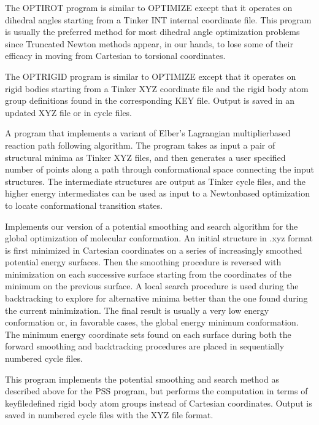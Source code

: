 \documentclass[letterpaper,11pt,english]{sphinxmanual}
\begin{document}

The OPTIROT program is similar to OPTIMIZE except that it operates on dihedral angles starting from a Tinker INT internal coordinate file. This program is usually the preferred method for most dihedral angle optimization problems since Truncated Newton methods appear, in our hands, to lose some of their efficacy in moving from Cartesian to torsional coordinates.


The OPTRIGID program is similar to OPTIMIZE except that it operates on rigid bodies starting from a Tinker XYZ coordinate file and the rigid body atom group definitions found in the corresponding KEY file. Output is saved in an updated XYZ file or in cycle files.


A program that implements a variant of Elber’s Lagrangian multiplier\sphinxhyphen{}based reaction path following algorithm. The program takes as input a pair of structural minima as Tinker XYZ files, and then generates a user specified number of points along a path through conformational space connecting the input structures. The intermediate structures are output as Tinker cycle files, and the higher energy intermediates can be used as input to a Newton\sphinxhyphen{}based optimization to locate conformational transition states.


Implements our version of a potential smoothing and search algorithm for the global optimization of molecular conformation. An initial structure in .xyz format is first minimized in Cartesian coordinates on a series of increasingly smoothed potential energy surfaces. Then the smoothing procedure is reversed with minimization on each successive surface starting from the coordinates of the minimum on the previous surface. A local search procedure is used during the backtracking to explore for alternative minima better than the one found during the current minimization. The final result is usually a very low energy conformation or, in favorable cases, the global energy minimum conformation. The minimum energy coordinate sets found on each surface during both the forward smoothing and backtracking procedures are placed in sequentially numbered cycle files.


This program implements the potential smoothing and search method as described above for the PSS program, but performs the computation in terms of keyfile\sphinxhyphen{}defined rigid body atom groups instead of Cartesian coordinates. Output is saved in numbered cycle files with the XYZ file format.
\end{document}
